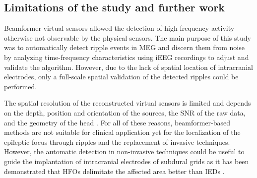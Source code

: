 \subsection{Limitations of the study and further work}

Beamformer virtual sensors allowed the detection of high-frequency activity otherwise not observable by the physical sensors. The main purpose of this study was to automatically detect ripple events in MEG and discern them from noise by analyzing time-frequency characteristics using iEEG recordings to adjust and validate the algorithm. However, due to the lack of spatial location of intracranial electrodes, only a full-scale spatial validation of the detected ripples could be performed. 

The spatial resolution of the reconstructed virtual sensors is limited and depends on the depth, position and orientation of the sources, the SNR of the raw data, and the geometry of the head \citep{Hillebrand2002}. For all of these reasons, beamformer-based methods are not suitable for clinical application yet for the localization of the epileptic focus through ripples and the replacement of invasive techniques. However, the automatic detection in non-invasive techniques could be useful to guide the implantation of intracranial electrodes of subdural grids as it has been demonstrated that HFOs delimitate the affected area better than IEDs \citep{Jacobs2008}.

